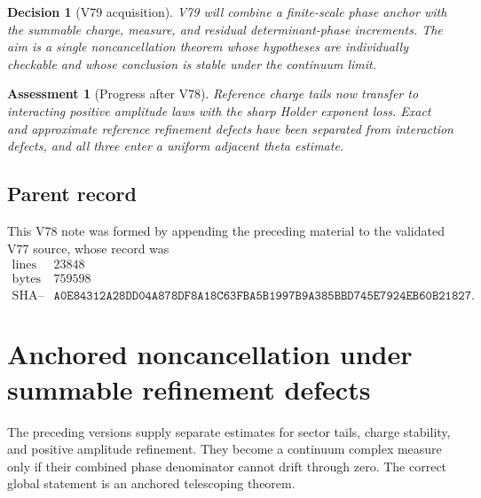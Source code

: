 \documentclass[11pt]{article}
\newtheorem{assessment}[theorem]{Assessment}
\newtheorem{decision}[theorem]{Decision}
\begin{document}
\begin{decision}[V79 acquisition]
\label{dec:v11v78-next}
V79 will combine a finite-scale phase anchor with the summable
charge, measure, and residual determinant-phase increments.  The aim
is a single noncancellation theorem whose hypotheses are individually
checkable and whose conclusion is stable under the continuum limit.
\end{decision}

\begin{assessment}[Progress after V78]
\label{ass:v11v78-status}
Reference charge tails now transfer to interacting positive amplitude
laws with the sharp Holder exponent loss.  Exact and approximate
reference refinement defects have been separated from interaction
defects, and all three enter a uniform adjacent theta estimate.
\end{assessment}

\subsection{Parent record}

This V78 note was formed by appending the preceding material to the
validated V77 source, whose record was
\[
\begin{array}{c|c}
\text{lines}&23848\\
\text{bytes}&759598\\
\text{SHA--256}&
\texttt{A0E84312A28DD04A878DF8A18C63FBA5B1997B9A385BBD745E7924EB60B21827}.
\end{array}                                                     \tag{78.21}
\]


\section{Anchored noncancellation under summable refinement defects}
\label{sec:v11v79}

The preceding versions supply separate estimates for sector tails,
charge stability, and positive amplitude refinement.  They become a
continuum complex measure only if their combined phase denominator
cannot drift through zero.  The correct global statement is an
anchored telescoping theorem.
\end{document}
